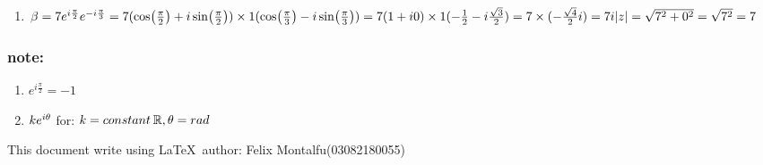 \documentclass[a4paper]{article}
\begin{document}
\begin{enumerate}[1.]
        \item $\beta = 7e^{i\frac{\pi}{2}}e^{-i\frac{\pi}{3}}\\
        =7(\cos(\frac{\pi}{2}) + i \sin(\frac{\pi}{2})) \times 1(\cos(\frac{\pi}{3})-i\sin(\frac{\pi}{3}))\\
        =7(1+i0) \times 1(-\frac{1}{2} - i \frac{\sqrt{3}}{2})\\
        =7 \times (-\frac{\sqrt{4}}{2}i)\\
        =7i\\
        \\
        \abs{z}=\sqrt{7^2+0^2}\\
        =\sqrt{7^2}\\
        =7
        $
    \end{enumerate}
    \subsubsection*{note: }
    \begin{enumerate}[I]
        \item $e^{i\frac{\pi}{2}} = -1$
        \item $ke^{i\theta}\\$
        for: $k = constant \hspace*{2px} \mathbb{R}, \theta = rad\\$
    \end{enumerate}
    This document write using \LaTeX \ author: Felix Montalfu(03082180055) 
\end{document}
